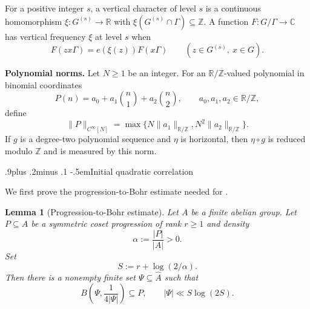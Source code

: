 \documentclass[twoside]{aomart}
\makeatletter
\theoremstyle{paperplain}
\newtheorem{lemma}[theorem]{Lemma}
\theoremstyle{paperdefinition}
\renewcommand\subsection{\@startsection{subsection}{2}{\z@}
  {.9\baselineskip plus .2\baselineskip minus .1\baselineskip}
  {-.5em}{\normalfont\bfseries}}
\numberwithin{equation}{section}
\makeatother
\begin{document}
For a positive integer $s$, a vertical character of level $s$ is a
continuous homomorphism $\xi:G^{(s)}\to\mathbb R$ with
$\xi(G^{(s)}\cap\Gamma)\subseteq\mathbb Z$. A function
$F:G/\Gamma\to\mathbb C$ has vertical frequency $\xi$ at level $s$
when
\begin{equation*}
 F(zx\Gamma)=e(\xi(z))F(x\Gamma)
 \qquad(z\in G^{(s)},\ x\in G).
\end{equation*}

\medskip
\noindent\textbf{Polynomial norms.}
Let $N\ge1$ be an integer. For an $\mathbb R/\mathbb Z$-valued
polynomial in binomial coordinates
\[
 P(n)=a_0+a_1\binom n1+a_2\binom n2,
 \qquad a_0,a_1,a_2\in\mathbb R/\mathbb Z,
\]
define
\[
 \|P\|_{C^\infty[N]}
 =\max\{N\|a_1\|_{\mathbb R/\mathbb Z},
        N^2\|a_2\|_{\mathbb R/\mathbb Z}\}.
\]
If $g$ is a degree-two polynomial sequence and $\eta$ is horizontal,
then $\eta\circ g$ is reduced modulo $\mathbb Z$ and is measured by
this norm.

\subsection{Initial quadratic correlation}

We first prove the progression-to-Bohr estimate needed for
.

\begin{lemma}[Progression-to-Bohr estimate]
\label{inv:progression-bohr}
Let $A$ be a finite abelian group. Let $P\subseteq A$ be a symmetric
coset progression of rank $r\ge1$ and density
\[
 \alpha:=\frac{|P|}{|A|}>0.
\]
Set
\[
 S:=r+\log(2/\alpha).
\]
Then there is a nonempty finite set $\Psi\subseteq\widehat A$ such that
\begin{equation*}
 B\!\left(\Psi,\frac{1}{4|\Psi|}\right)\subseteq P,
 \qquad
 |\Psi|\ll S\log(2S).
\end{equation*}
\end{lemma}
\end{document}
